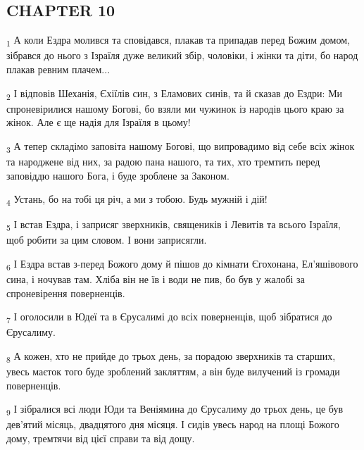 \subsection{CHAPTER 10}
\begin{tcolorbox}
\textsubscript{1} А коли Ездра молився та сповідався, плакав та припадав перед Божим домом, зібрався до нього з Ізраїля дуже великий збір, чоловіки, і жінки та діти, бо народ плакав ревним плачем...
\end{tcolorbox}
\begin{tcolorbox}
\textsubscript{2} І відповів Шеханія, Єхіїлів син, з Еламових синів, та й сказав до Ездри: Ми спроневірилися нашому Богові, бо взяли ми чужинок із народів цього краю за жінок. Але є ще надія для Ізраїля в цьому!
\end{tcolorbox}
\begin{tcolorbox}
\textsubscript{3} А тепер складімо заповіта нашому Богові, що випровадимо від себе всіх жінок та народжене від них, за радою пана нашого, та тих, хто тремтить перед заповіддю нашого Бога, і буде зроблене за Законом.
\end{tcolorbox}
\begin{tcolorbox}
\textsubscript{4} Устань, бо на тобі ця річ, а ми з тобою. Будь мужній і дій!
\end{tcolorbox}
\begin{tcolorbox}
\textsubscript{5} І встав Ездра, і заприсяг зверхників, священиків і Левитів та всього Ізраїля, щоб робити за цим словом. І вони заприсягли.
\end{tcolorbox}
\begin{tcolorbox}
\textsubscript{6} І Ездра встав з-перед Божого дому й пішов до кімнати Єгохонана, Ел'яшівового сина, і ночував там. Хліба він не їв і води не пив, бо був у жалобі за спроневірення поверненців.
\end{tcolorbox}
\begin{tcolorbox}
\textsubscript{7} І оголосили в Юдеї та в Єрусалимі до всіх поверненців, щоб зібратися до Єрусалиму.
\end{tcolorbox}
\begin{tcolorbox}
\textsubscript{8} А кожен, хто не прийде до трьох день, за порадою зверхників та старших, увесь маєток того буде зроблений закляттям, а він буде вилучений із громади поверненців.
\end{tcolorbox}
\begin{tcolorbox}
\textsubscript{9} І зібралися всі люди Юди та Веніямина до Єрусалиму до трьох день, це був дев'ятий місяць, двадцятого дня місяця. І сидів увесь народ на площі Божого дому, тремтячи від цієї справи та від дощу.
\end{tcolorbox}
